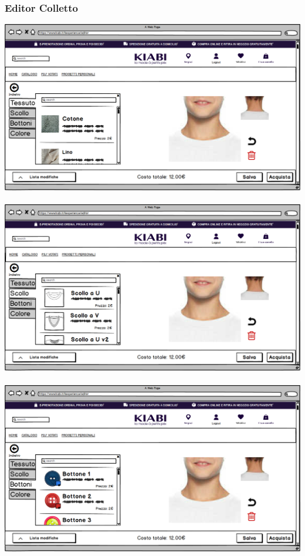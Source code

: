 \documentclass[12pt,italian,]{report}
\begin{document}
\subsubsection{Editor Colletto} 
\includegraphics{balsamiq/Editor - caratteristica collo tessuto.png}
\\
\\
\includegraphics{balsamiq/Editor - caratteristica collo scollo.png}
\\
\\
\includegraphics{balsamiq/Editor - caratteristica collo bottoni.png}
\end{document}
